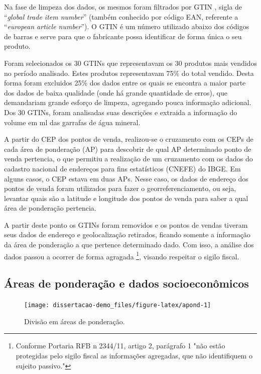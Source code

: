 \documentclass[
  12pt,
]{book}
\begin{document}
Na fase de limpeza dos dados, os mesmos foram filtrados por GTIN , sigla de ``\emph{global trade item number}'' (também conhecido por código EAN, referente a ``\emph{european article number}''). O GTIN é um número utilizado abaixo dos códigos de barras e serve para que o fabricante possa identificar de forma única o seu produto.

Foram selecionados os 30 GTINs que representavam os 30 produtos mais vendidos no período analisado. Estes produtos representavam 75\% do total vendido. Desta forma foram excluidos 25\% dos dados entre os quais se encontra a maior parte dos dados de baixa qualidade (onde há grande quantidade de erros), que demandariam grande esforço de limpeza, agregando pouca informação adicional. Dos 30 GTINs, foram analisadas suas descrições e extraida a informação do volume em ml das garrafas de água mineral.

A partir do CEP dos pontos de venda, realizou-se o cruzamento com os CEPs de cada área de ponderação (AP) para descobrir de qual AP determinado ponto de venda pertencia, o que permitiu a realização de um cruzamento com os dados do cadastro nacional de endereços para fins estatísticos (CNEFE) do IBGE. Em alguns casos, o CEP estava em duas APs. Nesse caso, os dados de endereço dos pontos de venda foram utilizados para fazer o georreferenciamento, ou seja, levantar quais são a latitude e longitude dos pontos de venda para saber a qual área de ponderação pertencia.

A partir deste ponto os GTINs foram removidos e os pontos de vendas tiveram seus dados de endereço e geolocalização retirados, ficando somente a informação da área de ponderação a que pertence determinado dado. Com isso, a análise dos dados passou a ocorrer de forma agragada \footnote[1]{Conforme Portaria RFB n 2344/11, artigo 2, parágrafo 1 "não estão protegidas pelo sigilo fiscal as informações agregadas, que não identifiquem o sujeito passivo."}, visando respeitar o sigilo fiscal.

\hypertarget{uxe1reas-de-ponderauxe7uxe3o-e-dados-socioeconuxf4micos}{%
\subsection{Áreas de ponderação e dados socioeconômicos}\label{uxe1reas-de-ponderauxe7uxe3o-e-dados-socioeconuxf4micos}}

\begin{figure}

{\centering \texttt{[image: dissertacao-demo\_files/figure-latex/apond-1]} 

}

\caption{Divisão em áreas de ponderação.}\label{fig:apond}
\end{figure}
\end{document}
